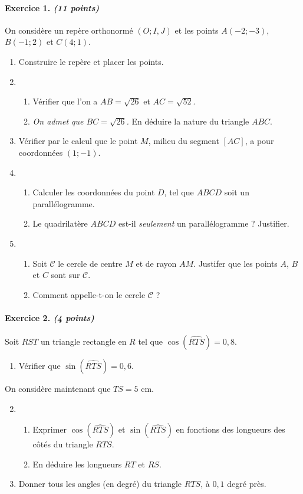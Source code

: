 \documentclass[11pt]{article}
\begin{document}
\paragraph{Exercice 1. \emph{(11 points)}} On considère un repère orthonormé $(O; I, J)$ et les
points $A(-2; -3)$, $B(-1; 2)$ et $C(4;1)$.
\begin{enumerate}
  \item Construire le repère et placer les points.
  \item \begin{enumerate}
      \item Vérifier que l'on a $AB=\sqrt{26}$ et $AC=\sqrt{52}$.
      \item \emph{On admet que $BC=\sqrt{26}$.} En déduire la nature du triangle $ABC$.
    \end{enumerate}
  \item Vérifier  par le calcul que le point $M$, milieu du segment $\left[ AC
    \right]$, a pour coordonnées $(1;-1)$.
  \item \begin{enumerate}
      \item Calculer les coordonnées du point $D$, tel que $ABCD$ soit un
    parallélogramme.
  \item Le quadrilatère $ABCD$ est-il \emph{seulement} un parallélogramme ?
    Justifier.
    \end{enumerate}
  \item \begin{enumerate}
      \item Soit $\mathscr C$ le cercle de centre $M$ et de rayon $AM$. Justifer
        que les points $A$, $B$ et $C$ sont sur $\mathscr C$.
      \item Comment appelle-t-on le cercle $\mathscr C$ ?
    \end{enumerate}
\end{enumerate}

\paragraph{Exercice 2. \emph{(4 points)}} Soit $RST$ un triangle rectangle en $R$ tel que
$\cos\left( \widehat{RTS} \right)=0,8$.
\begin{enumerate}
  \item Vérifier que $\sin\left( \widehat{RTS} \right)=0,6$.
\end{enumerate}
\noindent On considère maintenant que $TS=5$ cm.
\begin{enumerate}
    \setcounter{enumi}{1}
  \item \begin{enumerate}
      \item Exprimer $\cos\left( \widehat{RTS} \right)$ et
        $\sin\left(\widehat{RTS}\right)$ en fonctions des longueurs des côtés du triangle
    $RTS$.
  \item En déduire les longueurs $RT$ et $RS$.
    \end{enumerate}
  \item Donner tous les angles (en degré) du triangle $RTS$, à $0,1$ degré près.
\end{enumerate}
\end{document}
